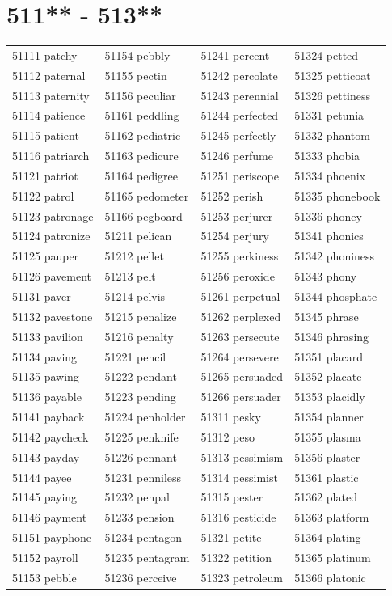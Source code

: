 \documentclass[10pt, oneside]{book}
\begin{document}
\begin{table}
	\centering
	\section*{511** - 513**}
	\begin{tabular}{l l l l}
51111 patchy &51154 pebbly &51241 percent &51324 petted\\
51112 paternal &51155 pectin &51242 percolate &51325 petticoat\\
51113 paternity &51156 peculiar &51243 perennial &51326 pettiness\\
51114 patience &51161 peddling &51244 perfected &51331 petunia\\
51115 patient &51162 pediatric &51245 perfectly &51332 phantom\\
51116 patriarch &51163 pedicure &51246 perfume &51333 phobia\\
51121 patriot &51164 pedigree &51251 periscope &51334 phoenix\\
51122 patrol &51165 pedometer &51252 perish &51335 phonebook\\
51123 patronage &51166 pegboard &51253 perjurer &51336 phoney\\
51124 patronize &51211 pelican &51254 perjury &51341 phonics\\
51125 pauper &51212 pellet &51255 perkiness &51342 phoniness\\
51126 pavement &51213 pelt &51256 peroxide &51343 phony\\
51131 paver &51214 pelvis &51261 perpetual &51344 phosphate\\
51132 pavestone &51215 penalize &51262 perplexed &51345 phrase\\
51133 pavilion &51216 penalty &51263 persecute &51346 phrasing\\
51134 paving &51221 pencil &51264 persevere &51351 placard\\
51135 pawing &51222 pendant &51265 persuaded &51352 placate\\
51136 payable &51223 pending &51266 persuader &51353 placidly\\
51141 payback &51224 penholder &51311 pesky &51354 planner\\
51142 paycheck &51225 penknife &51312 peso &51355 plasma\\
51143 payday &51226 pennant &51313 pessimism &51356 plaster\\
51144 payee &51231 penniless &51314 pessimist &51361 plastic\\
51145 paying &51232 penpal &51315 pester &51362 plated\\
51146 payment &51233 pension &51316 pesticide &51363 platform\\
51151 payphone &51234 pentagon &51321 petite &51364 plating\\
51152 payroll &51235 pentagram &51322 petition &51365 platinum\\
51153 pebble &51236 perceive &51323 petroleum &51366 platonic\\
	\end{tabular}
 \end{table}
\clearpage
\end{document}
